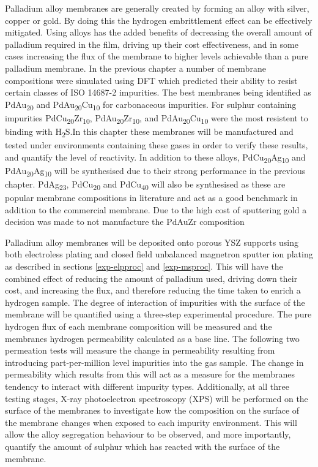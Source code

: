 Palladium alloy membranes are generally created by forming an alloy with silver, copper or gold. By doing this the hydrogen embrittlement effect can be effectively mitigated. Using alloys has the added benefits of decreasing the overall amount of palladium required in the film, driving up their cost effectiveness, and in some cases increasing the flux of the membrane to higher levels achievable than a pure palladium membrane. In the previous chapter a number of membrane compositions were simulated using DFT which predicted their ability to resist certain classes of ISO 14687-2 impurities. The best membranes being identified as PdAu\textsubscript{20} and PdAu\textsubscript{20}Cu\textsubscript{10} for carbonaceous impurities. For sulphur containing impurities PdCu\textsubscript{20}Zr\textsubscript{10}, PdAu\textsubscript{20}Zr\textsubscript{10}, and PdAu\textsubscript{20}Cu\textsubscript{10} were the most resistent to binding with H\textsubscript{2}S.In this chapter these membranes will be manufactured and tested under environments containing these gases in order to verify these results, and quantify the level of reactivity. In addition to these alloys, PdCu\textsubscript{20}Ag\textsubscript{10} and PdAu\textsubscript{20}Ag\textsubscript{10} will be synthesised due to their strong performance in the previous chapter. PdAg\textsubscript{23}, PdCu\textsubscript{20} and PdCu\textsubscript{40} will also be synthesised as these are popular membrane compositions in literature and act as a good benchmark in addition to the commercial membrane. Due to the high cost of sputtering gold a decision was made to not manufacture the PdAuZr composition

Palladium alloy membranes will be deposited onto porous YSZ supports using both electroless plating  and closed field unbalanced magnetron sputter ion plating as described in sections \ref{exp-elpproc} and \ref{exp-msproc}. This will have the combined effect of reducing the amount of palladium used, driving down their cost, and  increasing the flux, and therefore reducing the time taken to enrich a hydrogen sample. The degree of interaction of impurities with the surface of the membrane will be quantified using a three-step experimental procedure. The pure hydrogen flux of each membrane composition will be measured and the membranes hydrogen permeability calculated as a base line. The following two permeation tests will measure the change in permeability resulting from introducing part-per-million level impurities into the gas sample. The change in permeability which results from this will act as a measure for the membranes tendency to interact with different impurity types. Additionally, at all three testing stages, X-ray photoelectron spectroscopy (XPS) will be performed on the surface of the membranes to investigate how the composition on the surface of the membrane changes when exposed to each impurity environment. This will allow the alloy segregation behaviour to be observed, and more importantly, quantify the amount of sulphur which has reacted with the surface of the membrane. 

